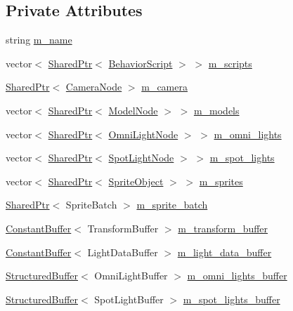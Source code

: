 \subsection*{Private Attributes}
\begin{DoxyCompactItemize}
\item 
string \hyperlink{classmage_1_1_scene_a6cc8cb08b1853c4e3063b33a94e8fb47}{m\+\_\+name}
\item 
vector$<$ \hyperlink{namespacemage_a1e01ae66713838a7a67d30e44c67703e}{Shared\+Ptr}$<$ \hyperlink{classmage_1_1_behavior_script}{Behavior\+Script} $>$ $>$ \hyperlink{classmage_1_1_scene_a84548bf6978f8955ce5892cb23536a4e}{m\+\_\+scripts}
\item 
\hyperlink{namespacemage_a1e01ae66713838a7a67d30e44c67703e}{Shared\+Ptr}$<$ \hyperlink{classmage_1_1_camera_node}{Camera\+Node} $>$ \hyperlink{classmage_1_1_scene_a39c785951d9fb99477c1894eabba0cc6}{m\+\_\+camera}
\item 
vector$<$ \hyperlink{namespacemage_a1e01ae66713838a7a67d30e44c67703e}{Shared\+Ptr}$<$ \hyperlink{classmage_1_1_model_node}{Model\+Node} $>$ $>$ \hyperlink{classmage_1_1_scene_a01132a667fbc1517f11ae561bc221071}{m\+\_\+models}
\item 
vector$<$ \hyperlink{namespacemage_a1e01ae66713838a7a67d30e44c67703e}{Shared\+Ptr}$<$ \hyperlink{namespacemage_a1724c6e6b6b5ba535cdd967cbbb4a669}{Omni\+Light\+Node} $>$ $>$ \hyperlink{classmage_1_1_scene_a881c3dd7e85e5069650f29fd2722bf78}{m\+\_\+omni\+\_\+lights}
\item 
vector$<$ \hyperlink{namespacemage_a1e01ae66713838a7a67d30e44c67703e}{Shared\+Ptr}$<$ \hyperlink{namespacemage_aeed5dee4ff6c591eabb0e9114256df4a}{Spot\+Light\+Node} $>$ $>$ \hyperlink{classmage_1_1_scene_a4e1954bc0b812d6a71123ca3ac9eeb75}{m\+\_\+spot\+\_\+lights}
\item 
vector$<$ \hyperlink{namespacemage_a1e01ae66713838a7a67d30e44c67703e}{Shared\+Ptr}$<$ \hyperlink{classmage_1_1_sprite_object}{Sprite\+Object} $>$ $>$ \hyperlink{classmage_1_1_scene_a7379b399f02999f89f6ccda5bfa01b02}{m\+\_\+sprites}
\item 
\hyperlink{namespacemage_a1e01ae66713838a7a67d30e44c67703e}{Shared\+Ptr}$<$ Sprite\+Batch $>$ \hyperlink{classmage_1_1_scene_a7a334e1b7764532817f10efbc0b91a82}{m\+\_\+sprite\+\_\+batch}
\item 
\hyperlink{structmage_1_1_constant_buffer}{Constant\+Buffer}$<$ Transform\+Buffer $>$ \hyperlink{classmage_1_1_scene_a2e57c981725d0a64bfc8f82381ac3d6a}{m\+\_\+transform\+\_\+buffer}
\item 
\hyperlink{structmage_1_1_constant_buffer}{Constant\+Buffer}$<$ Light\+Data\+Buffer $>$ \hyperlink{classmage_1_1_scene_aa74ca1637e0a88546135d64bf3614f29}{m\+\_\+light\+\_\+data\+\_\+buffer}
\item 
\hyperlink{structmage_1_1_structured_buffer}{Structured\+Buffer}$<$ Omni\+Light\+Buffer $>$ \hyperlink{classmage_1_1_scene_a274ed5e548431ba805513a86a00bbaf1}{m\+\_\+omni\+\_\+lights\+\_\+buffer}
\item 
\hyperlink{structmage_1_1_structured_buffer}{Structured\+Buffer}$<$ Spot\+Light\+Buffer $>$ \hyperlink{classmage_1_1_scene_a64118c052d728ac988031898fd2d757d}{m\+\_\+spot\+\_\+lights\+\_\+buffer}
\end{DoxyCompactItemize}



